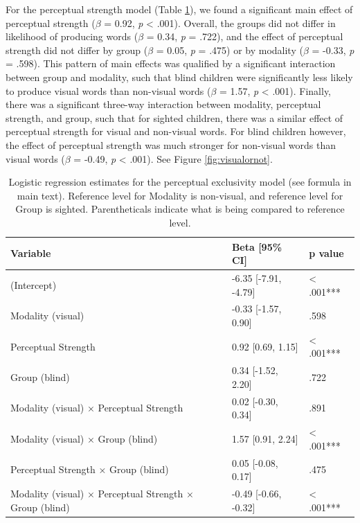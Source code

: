 \documentclass[english,man,floatsintext]{apa6}
\begin{document}
For the perceptual strength model (Table \ref{tab:ps-table}), we found a significant main effect of perceptual strength (\(\beta\) = 0.92, \emph{p} \textless{} .001). Overall, the groups did not differ in likelihood of producing words (\(\beta\) = 0.34, \emph{p} = .722), and the effect of perceptual strength did not differ by group (\(\beta\) = 0.05, \emph{p} = .475) or by modality (\(\beta\) = -0.33, \emph{p} = .598). This pattern of main effects was qualified by a significant interaction between group and modality, such that blind children were significantly less likely to produce visual words than non-visual words (\(\beta\) = 1.57, \emph{p} \textless{} .001). Finally, there was a significant three-way interaction between modality, perceptual strength, and group, such that for sighted children, there was a similar effect of perceptual strength for visual and non-visual words. For blind children however, the effect of perceptual strength was much stronger for non-visual words than visual words (\(\beta\) = -0.49, \emph{p} \textless{} .001). See Figure \ref{fig:visualornot}.

\begin{table}[H]

\caption{\label{tab:ps-table}Logistic regression estimates for the perceptual exclusivity model (see formula in main text). Reference level for Modality is non-visual, and reference level for Group is sighted. Parentheticals indicate what is being compared to reference level.}
\centering
\begin{tabular}[t]{l|l|l}
\hline
Variable & Beta [95\% CI] & p value\\
\hline
(Intercept) & -6.35 [-7.91, -4.79] & < .001***\\
\hline
Modality (visual) & -0.33 [-1.57, 0.90] & .598\\
\hline
Perceptual Strength & 0.92 [0.69, 1.15] & < .001***\\
\hline
Group (blind) & 0.34 [-1.52, 2.20] & .722\\
\hline
Modality (visual) × Perceptual Strength & 0.02 [-0.30, 0.34] & .891\\
\hline
Modality (visual) × Group (blind) & 1.57 [0.91, 2.24] & < .001***\\
\hline
Perceptual Strength × Group (blind) & 0.05 [-0.08, 0.17] & .475\\
\hline
Modality (visual) × Perceptual Strength × Group (blind) & -0.49 [-0.66, -0.32] & < .001***\\
\hline
\end{tabular}
\end{table}
\end{document}
